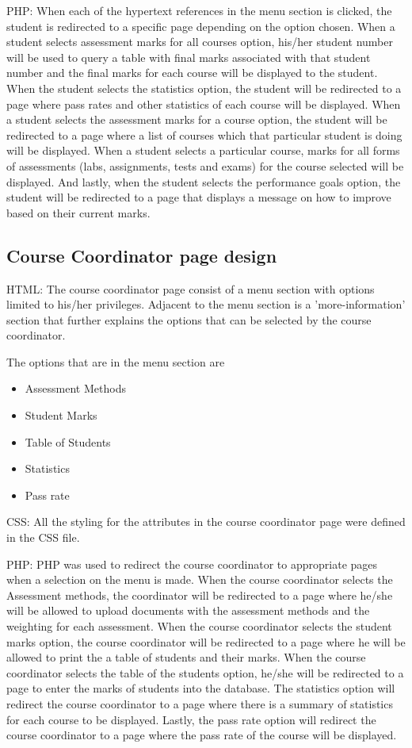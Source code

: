 PHP: When each of the hypertext references in the menu section is clicked, the student is redirected to a specific page depending on the option chosen. When a student selects assessment marks for all courses option, his/her student number will be used to query a table with final marks associated with that student number and the final marks for each course will be displayed to the student. When the student selects the statistics option, the student will be redirected to a page where pass rates and other statistics of each course will be displayed. When a student selects the assessment marks for a course option, the student will be redirected to a page where a list of courses which that particular student is doing will be displayed. When a student selects a particular course, marks for all forms of assessments (labs, assignments, tests and exams) for the course selected will be displayed. And lastly, when the student selects the performance goals option, the student will be redirected to a page that displays a message on how to improve based on their current marks.

\subsection{Course Coordinator page design}

  
HTML: The course coordinator page consist of a menu section with options limited to his/her privileges. Adjacent to the menu section is a 'more-information' section that further explains the options that can be selected by the course coordinator. 

The options that are in the menu section are

\begin{itemize}
\item Assessment Methods
\item Student Marks
\item Table of Students 
\item Statistics
\item Pass rate
\end{itemize}

CSS: All the styling for the attributes in the course coordinator page were defined in the CSS file.

PHP: PHP was used to redirect the course coordinator to appropriate pages when a selection on the menu is made. When the course coordinator selects the Assessment methods, the coordinator will be redirected to a page where he/she will be allowed to upload documents with the assessment methods and the weighting for each assessment. When the course coordinator selects the student marks option, the course coordinator will be redirected to a page where he will be allowed to print the a table of students and their marks.
When the course coordinator selects the table of the students option, he/she will be redirected to a page to enter the marks of students into the database. The statistics option will redirect the course coordinator to a page where there is a summary of statistics for each course to be displayed. Lastly, the pass rate option will redirect the course coordinator to a page where the pass rate of the course will be displayed. 
%
